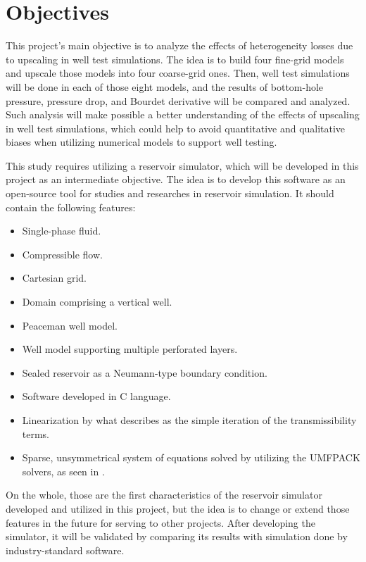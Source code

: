 
\section{Objectives}

This project's main objective is to analyze the effects of heterogeneity losses due to upscaling in well test simulations.
%
The idea is to build four fine-grid models and upscale those models into four coarse-grid ones.
%
Then, well test simulations will be done in each of those eight models, and the results of bottom-hole pressure, pressure drop, and Bourdet derivative will be compared and analyzed.
%
Such analysis will make possible a better understanding of the effects of upscaling in well test simulations, which could help to avoid quantitative and qualitative biases when utilizing numerical models to support well testing.

This study requires utilizing a reservoir simulator, which will be developed in this project as an intermediate objective.
%
The idea is to develop this software as an open-source tool for studies and researches in reservoir simulation.
%
It should contain the following features:

\begin{itemize}
	\item Single-phase fluid.
	\item Compressible flow.
	\item Cartesian grid.
	\item Domain comprising a vertical well.
	\item Peaceman well model.
	\item Well model supporting multiple perforated layers.
	\item Sealed reservoir as a Neumann-type boundary condition.
	\item Software developed in C language.
	\item Linearization by what \cite{Ertekin2001} describes as the simple iteration of the transmissibility terms.
	\item Sparse, unsymmetrical system of equations solved by utilizing the UMFPACK solvers, as seen in \cite{Davis1995}.
\end{itemize}
On the whole, those are the first characteristics of the reservoir simulator developed and utilized in this project, but the idea is to change or extend those features in the future for serving to other projects.
%
After developing the simulator, it will be validated by comparing its results with simulation done by industry-standard software.

